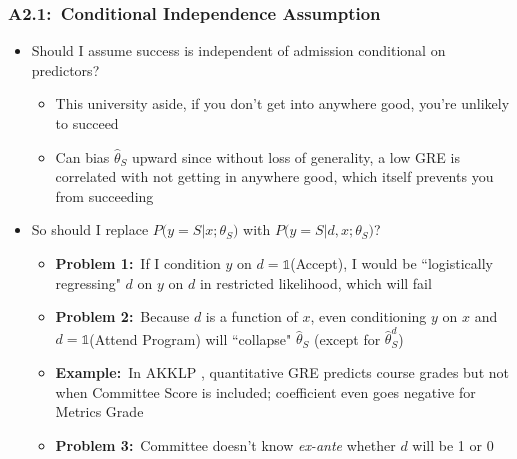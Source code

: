 \documentclass[12pt, aspectratio=169]{beamer}
\begin{document}
\begin{frame}[label=cia]
\frametitle{A2.1:\ Conditional Independence Assumption}
\begin{itemize}
\item Should I assume success is independent of admission conditional on predictors?
\vspace{2.5pt}
\begin{itemize}
\item This university aside, if you don't get into anywhere good, you're unlikely to succeed\!
\vspace{2.5pt}
\item Can bias $\hat\theta_S$ upward since without loss of generality, a low GRE is correlated with not getting in anywhere good, which itself prevents you from succeeding
\vspace{5pt}
\end{itemize}
\item So should I replace $P\big(y=S\big|x;\theta_S\big)$ with $P\big(y=S\big|d,x;\theta_S\big)$?
\vspace{2.5pt}
\begin{itemize}
\item \textbf{Problem 1:}\ If I condition $y$ on $d=\mathds{1}$(Accept), I would be ``logistically regressing" $d$ on $y$ on $d$ in restricted likelihood, which will fail
\vspace{2.5pt}
\item \textbf{Problem 2:}\ Because $d$ is a function of $x$, even conditioning $y$ on $x$ and \\ $d=\mathds{1}$(Attend Program) will ``collapse" $\hat\theta_S$ (except for $\hat\theta_S^d$)
\vspace{2.5pt}
\item[$\bigstar$] \textbf{Example:}\ In AKKLP , quantitative GRE predicts course grades but not when Committee Score is included; coefficient even goes negative for Metrics Grade
\vspace{2.5pt}
\item \textbf{Problem 3:}\ Committee doesn't know \textit{ex-ante} whether $d$ will be 1 or 0
\vspace{5pt}
\end{itemize}
\end{itemize}
\hyperlink{mle}{}
\end{frame}
\end{document}
